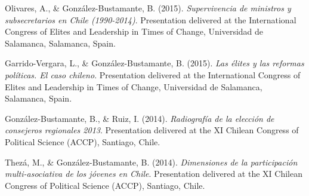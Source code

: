 \begin{publications}
\begin{benumerate}{87}
\item{Olivares, A., \& González-Bustamante, B. (2015). {\itshape Supervivencia de ministros y subsecretarios en Chile (1990-2014)}. Presentation delivered at the International Congress of Elites and Leadership in Times of Change, Universidad de Salamanca, Salamanca, Spain.}\vspace{1mm}


\item{Garrido-Vergara, L., \& González-Bustamante, B. (2015). {\itshape Las élites y las reformas políticas. El caso chileno}. Presentation delivered at the International Congress of Elites and Leadership in Times of Change, Universidad de Salamanca, Salamanca, Spain.}\vspace{1mm}


\item{González-Bustamante, B., \& Ruiz, I. (2014). {\itshape Radiografía de la elección de consejeros regionales 2013}. Presentation delivered at the XI Chilean Congress of Political Science (ACCP), Santiago, Chile.}\vspace{1mm}


\item{Thezá, M., \& González-Bustamante, B. (2014). {\itshape Dimensiones de la participación multi-asociativa de los jóvenes en Chile}. Presentation delivered at the XI Chilean Congress of Political Science (ACCP), Santiago, Chile.}\vspace{1mm}


\end{benumerate}
\end{publications}
